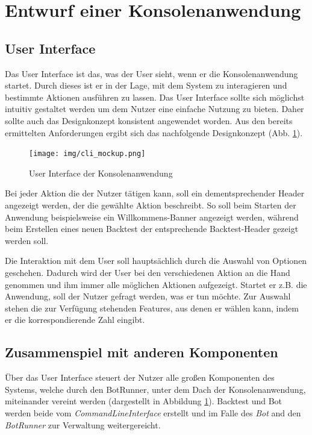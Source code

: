 \documentclass[oneside]{ausarbeitung}
\begin{document}

\section{Entwurf einer Konsolenanwendung}
\label{sec:entwurf_einer_konsolenanwendung}

\subsection{User Interface}
\label{sub:user_interface}

Das User Interface ist das, was der User sieht, wenn er die Konsolenanwendung startet. Durch dieses ist er in der Lage, mit dem System zu interagieren und bestimmte Aktionen ausführen zu lassen. Das User Interface sollte sich möglichst intuitiv gestaltet werden um dem Nutzer eine einfache Nutzung zu bieten. Daher sollte auch das Designkonzept konsistent angewendet worden. Aus den bereits ermittelten Anforderungen ergibt sich das nachfolgende Designkonzept (Abb. \ref{fig:15}).

\begin{figure}[H]
  \centering
  \texttt{[image: img/cli\_mockup.png]}
  \caption{User Interface der Konsolenanwendung}
  \label{fig:15}
\end{figure}

Bei jeder Aktion die der Nutzer tätigen kann, soll ein dementsprechender Header angezeigt werden, der die gewählte Aktion beschreibt. So soll beim Starten der Anwendung beispielsweise ein Willkommens-Banner angezeigt werden, während beim Erstellen eines neuen Backtest der entsprechende Backtest-Header gezeigt werden soll.

Die Interaktion mit dem User soll hauptsächlich durch die Auswahl von Optionen geschehen. Dadurch wird der User bei den verschiedenen Aktion an die Hand genommen und ihm immer alle möglichen Aktionen aufgezeigt. Startet er z.B. die Anwendung, soll der Nutzer gefragt werden, was er tun möchte. Zur Auswahl stehen die zur Verfügung stehenden Features, aus denen er wählen kann, indem er die korrespondierende Zahl eingibt.

\subsection{Zusammenspiel mit anderen Komponenten}
\label{sub:zusammenspiel_mit_anderen_komponenten}


Über das User Interface steuert der Nutzer alle großen Komponenten des Systems, welche durch den BotRunner, unter dem Dach der Konsolenanwendung, miteinander vereint werden (dargestellt in Abbildung \ref{fig:15}). Backtest und Bot werden beide vom \textit{CommandLineInterface} erstellt und im Falle des \textit{Bot} and den \textit{BotRunner} zur Verwaltung weitergereicht.
\end{document}
